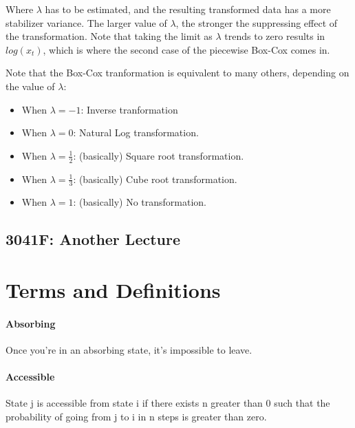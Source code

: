 \documentclass[12pt]{article}
\begin{document}
        Where $\lambda$ has to be estimated, and the resulting transformed data has a more stabilizer variance. 
        The larger value of $\lambda$, the stronger the suppressing effect of the transformation.
        Note that taking the limit as $\lambda$ trends to zero results in $log(x_t)$, which is where
        the second case of the piecewise Box-Cox comes in.

        Note that the Box-Cox tranformation is equivalent to many others, depending on the value of $\lambda$:
        \begin{itemize}
            \item When $\lambda = -1$: Inverse tranformation
            \item When $\lambda = 0$: Natural Log transformation.
            \item When $\lambda = \frac{1}{2}$: (basically) Square root transformation.
            \item When $\lambda = \frac{1}{3}$: (basically) Cube root transformation.
            \item When $\lambda = 1$: (basically) No transformation.
        \end{itemize}



    \subsection{3041F: Another Lecture}



\section{Terms and Definitions}
    \paragraph{Absorbing} Once you're in an absorbing state, it's impossible to leave.
    \paragraph{Accessible} State j is accessible from state i if there exists n greater than 0 such that the probability of going from j to i in n steps is greater than zero.
\end{document}
